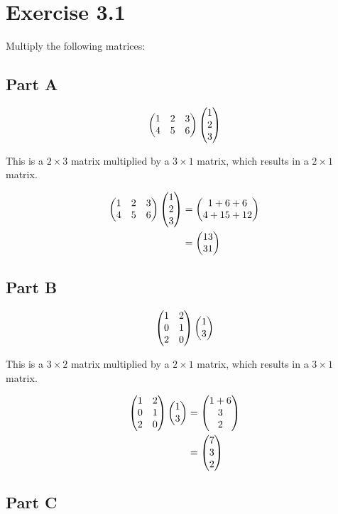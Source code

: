 \section*{Exercise 3.1}
Multiply the following matrices:

\subsection*{Part A}

\[
	\genericmat{p}{1&2&3\\4&5&6} \genericmat{p}{1\\2\\3}
\]

This is a $2 \times 3$ matrix multiplied by a $3 \times 1$ matrix, which results in a $2 \times 1$ matrix.

\[
	\begin{aligned}
		\genericmat{p}{1&2&3\\4&5&6} \genericmat{p}{1\\2\\3} &= \genericmat{p}{1 + 6 + 6 \\ 4 + 15 + 12} \\
		&= \genericmat{p}{13\\31}
	\end{aligned}
\]

\subsection*{Part B}

\[
	\genericmat{p}{1&2\\0&1\\2&0} \genericmat{p}{1\\3}
\]

This is a $3 \times 2$ matrix multiplied by a $2 \times 1$ matrix, which results in a $3 \times 1$ matrix.

\[
	\begin{aligned}
		\genericmat{p}{1&2\\0&1\\2&0} \genericmat{p}{1\\3} &= \genericmat{p}{1+6\\3\\2} \\
		&= \genericmat{p}{7\\3\\2}
	\end{aligned}
\]

\subsection*{Part C}

